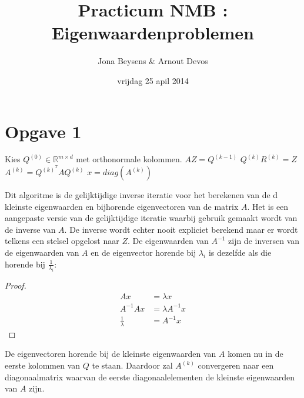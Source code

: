 \documentclass[a4paper]{article}
\title{Practicum NMB : Eigenwaardenproblemen}
\author{Jona Beysens \& Arnout Devos}
\date{vrijdag 25 apil 2014}
\newcommand{\opgave}[1]{\section*{Opgave #1}}
\begin{document}
\maketitle

\opgave{1}

\begin{algorithmic}
\State Kies $Q^{(0)} \in \mathbb{R}^{m\times d}$ met orthonormale kolommen.
    \State $AZ=Q^{(k-1)}$
    \State $Q^{(k)}R^{(k)}=Z$
    \State $A^{(k)}=Q^{(k)^{T}}AQ^{(k)}$
\EndFor
\State $x = diag(A^{(k)})$
\end{algorithmic}

Dit algoritme is de gelijktijdige inverse iteratie voor het berekenen van de d kleinste eigenwaarden en bijhorende eigenvectoren van de matrix $A$. Het is een aangepaste versie van de gelijktijdige iteratie waarbij gebruik gemaakt wordt van de inverse van $A$. De inverse wordt echter nooit expliciet berekend maar er wordt telkens een stelsel opgelost naar $Z$. De eigenwaarden van $A^{-1}$ zijn de inversen van de eigenwaarden van $A$ en de eigenvector horende bij $\lambda_i$ is dezelfde als die horende bij $\frac{1}{\lambda_i}$:
\begin{proof}
\begin{align}
	Ax &= \lambda x \label{eq1}\\ 
    A^{-1}Ax &= \lambda A^{-1}x \label{eq2}\\
    \frac{1}{\lambda} &= A^{-1}x \label{eq:const1}
\end{align}
\end{proof}
De eigenvectoren horende bij de kleinste eigenwaarden van $A$ komen nu in de eerste kolommen van $Q$ te staan. Daardoor zal $A^{(k)}$ convergeren naar een diagonaalmatrix waarvan de eerste diagonaalelementen de kleinste eigenwaarden van $A$ zijn.
\end{document}
